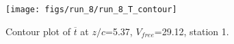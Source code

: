 \begin{figure}[H]
\centering
\texttt{[image: figs/run\_8/run\_8\_T\_contour]}
\caption{Contour plot of $\overline{t}$ at $z/c$=5.37, $V_{free}$=29.12, station 1.}
\label{fig:run_8_T_contour}
\end{figure}


